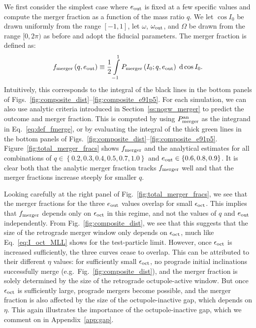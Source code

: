 \documentclass[
        fleqn,
        usenatbib,
    ]{mnras}
\newcommand*{\p}[1]{\left(#1\right)}
\newcommand*{\z}[1]{\left\{#1\right\}}
\begin{document}
We first consider the simplest case where $e_{\rm out}$ is fixed at a few
specific values and compute the merger fraction as a function of the mass ratio
$q$. We let $\cos I_0$ be drawn uniformly from the range $[-1, 1]$, let
$\omega$, $\omega_{\rm out}$, and $\Omega$ be drawn from the range $[0,
2\pi)$ as before %
and adopt the fiducial parameters. The merger fraction is defined as:
\begin{equation}
    f_{\rm merger}\p{q, e_{\rm out}} \equiv
        \frac{1}{2}\int\limits_{-1}^1P_{\rm merger}\p{I_0; q, e_{\rm out}}
            \;\mathrm{d}\cos I_0.\label{eq:def_fmerge}
\end{equation}
Intuitively, this corresponds to the integral of the black lines in the bottom
panels of Figs.~\ref{fig:composite_dist}--\ref{fig:composite_e91p5}. For each
simulation, we can also use analytic criteria introduced in
Section~\ref{ss:nogw_merger} to predict the outcome and merger fraction. This is
computed by using $P_{\rm merger}^{\rm an}$ as the integrand in
Eq.~\eqref{eq:def_fmerge}, or by evaluating the integral of the thick green
lines in the bottom panels of
Figs.~\ref{fig:composite_dist}--\ref{fig:composite_e91p5}.
Figure~\ref{fig:total_merger_fracs} shows $f_{\rm merger}$ and the analytical
estimates for all combinations
of $q \in \z{0.2, 0.3, 0.4, 0.5, 0.7, 1.0}$ and $e_{\rm out} \in \z{0.6, 0.8,
0.9}$. It is clear both that the analytic merger fraction tracks $f_{\rm
merger}$ well and that the merger fractions increase steeply for smaller $q$.

Looking carefully at the right panel of Fig.~\ref{fig:total_merger_fracs}, we
see that the merger fractions for the three $e_{\rm out}$ values overlap for
small $\epsilon_{\rm oct}$. This implies that $f_{\rm merger}$ depends only on
$\epsilon_{\rm oct}$ in this regime, and not the values of $q$ and $e_{\rm out}$
independently. From Fig.~\ref{fig:composite_dist}, we see that this suggests
that the size of the retrograde merger window only depends on $\epsilon_{\rm
oct}$, much like Eq.~\eqref{eq:I_oct_MLL} shows for the test-particle limit.
However, once $\epsilon_{\rm oct}$ is increased sufficiently, the three curves
cease to overlap. This can be attributed to their different $\eta$ values: for
sufficiently small $\epsilon_{\rm oct}$, no prograde initial inclinations
successfully merge (e.g.\ Fig.~\ref{fig:composite_dist}), and the merger
fraction is solely determined by the size of the retrograde octupole-active
window. But once $\epsilon_{\rm oct}$ is sufficiently large, prograde mergers
become possible, and the merger fraction is also affected by the size of the
octupole-inactive gap, which depends on $\eta$. This again illustrates the
importance of the octupole-inactive gap, which we comment on in
Appendix~\ref{app:gap}.
\end{document}
